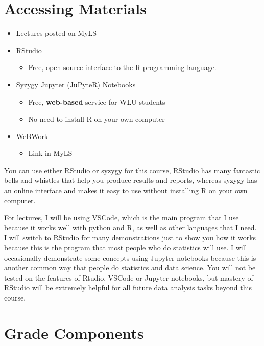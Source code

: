 \documentclass[
  letterpaper,
  DIV=11,
  numbers=noendperiod]{scrreprt}
\providecommand{\tightlist}{%
  \setlength{\itemsep}{0pt}\setlength{\parskip}{0pt}}\usepackage{longtable,booktabs,array}
\begin{document}
\hypertarget{accessing-materials}{%
\section{Accessing Materials}\label{accessing-materials}}

\begin{itemize}
\tightlist
\item
  Lectures posted on MyLS\lspace
\item
  RStudio

  \begin{itemize}
  \tightlist
  \item
    Free, open-source interface to the R programming language.\lspace
  \end{itemize}
\item
  Syzygy Jupyter (JuPyteR) Notebooks

  \begin{itemize}
  \tightlist
  \item
    Free, \textbf{web-based} service for WLU students
  \item
    No need to install R on your own computer\lspace
  \end{itemize}
\item
  WeBWork

  \begin{itemize}
  \tightlist
  \item
    Link in MyLS
  \end{itemize}
\end{itemize}

You can use either RStudio or syzygy for this course, RStudio has many
fantastic bells and whistles that help you produce results and reports,
whereas syzygy has an online interface and makes it easy to use without
installing R on your own computer.

For lectures, I will be using VSCode, which is the main program that I
use because it works well with python and R, as well as other languages
that I need. I will switch to RStudio for many demonstrations just to
show you how it works because this is the program that most people who
do statistics will use. I will occasionally demonstrate some concepts
using Jupyter notebooks because this is another common way that people
do statistics and data science. You will not be tested on the features
of Rtudio, VSCode or Jupyter notebooks, but mastery of RStudio will be
extremely helpful for all future data analysis tasks beyond this course.

\hypertarget{grade-components}{%
\section{Grade Components}\label{grade-components}}
\end{document}
